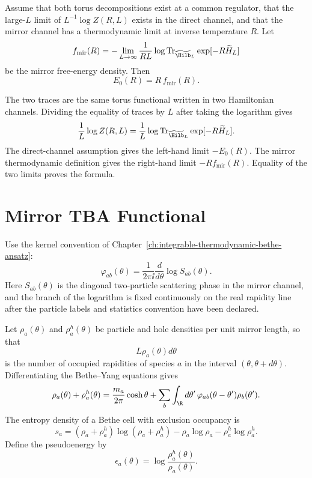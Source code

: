 \begin{remark}
\label{rem:mirror-pressure-vacuum-energy}
Assume that both torus decompositions exist at a common regulator, that the
large-\(L\) limit of \(L^{-1}\log Z(R,L)\) exists in the direct channel, and
that the mirror channel has a thermodynamic limit at inverse temperature
\(R\).  Let
\[
  f_{\mathrm{mir}}(R)
  =
  -\lim_{L\to\infty}\frac{1}{RL}\log
  \operatorname{Tr}_{\widetilde{\Hilb}_L}\exp[-R\widetilde H_L]
\]
be the mirror free-energy density.  Then
\[
  E_0(R)=R\,f_{\mathrm{mir}}(R).
\]
\end{remark}

The two traces are the same torus functional written in two Hamiltonian
channels.  Dividing the equality of traces by \(L\) after taking the logarithm
gives
\[
  \frac{1}{L}\log Z(R,L)
  =
  \frac{1}{L}\log
  \operatorname{Tr}_{\widetilde{\Hilb}_L}\exp[-R\widetilde H_L].
\]
The direct-channel assumption gives the left-hand limit \(-E_0(R)\).  The
mirror thermodynamic definition gives the right-hand limit
\(-R f_{\mathrm{mir}}(R)\).  Equality of the two limits proves the formula.

\section{Mirror TBA Functional}

Use the kernel convention of
Chapter~\ref{ch:integrable-thermodynamic-bethe-ansatz}:
\[
  \varphi_{ab}(\theta)
  =
  \frac{1}{2\pi\ii}\frac{d}{d\theta}\log S_{ab}(\theta).
\]
Here \(S_{ab}(\theta)\) is the diagonal two-particle scattering phase in the
mirror channel, and the branch of the logarithm is fixed continuously on the
real rapidity line after the particle labels and statistics convention have
been declared.

Let \(\rho_a(\theta)\) and \(\rho_a^h(\theta)\) be particle and hole densities
per unit mirror length, so that
\[
  L\rho_a(\theta)d\theta
\]
is the number of occupied rapidities of species \(a\) in the interval
\((\theta,\theta+d\theta)\).  Differentiating the Bethe--Yang equations gives
\[
  \rho_a(\theta)+\rho_a^h(\theta)
  =
  \frac{m_a}{2\pi}\cosh\theta
  +
  \sum_b\int_{\R}d\theta'\,
  \varphi_{ab}(\theta-\theta')\rho_b(\theta').
\]
The entropy density of a Bethe cell with exclusion occupancy is
\[
  s_a=
  (\rho_a+\rho_a^h)\log(\rho_a+\rho_a^h)
  -\rho_a\log\rho_a-\rho_a^h\log\rho_a^h .
\]
Define the pseudoenergy by
\[
  \epsilon_a(\theta)=\log\frac{\rho_a^h(\theta)}{\rho_a(\theta)} .
\]

